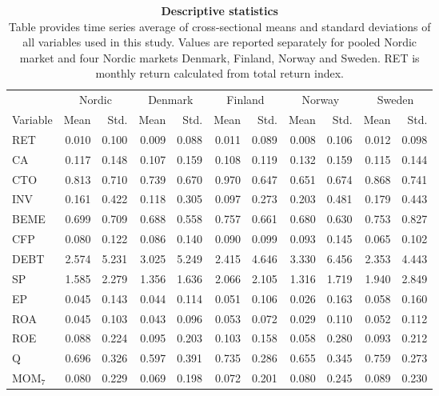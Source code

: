 \documentclass{article}
\begin{document}
\begin{table}[ht] 
\small
\caption[Descriptive statistics]{\textbf{Descriptive statistics}\\ Table provides time series average of cross-sectional means and standard deviations of all variables used in this study. Values are reported separately for pooled Nordic market and four Nordic markets Denmark, Finland, Norway and Sweden. RET is monthly return calculated from total return index.}
 \label{table:descriptive}
\centering
\begin{tabularx}{\textwidth}{@{\extracolsep{1pt}} X r r r r r r r r r r} 
\toprule
 & \multicolumn{2}{c}{Nordic} & \multicolumn{2}{c}{Denmark} & \multicolumn{2}{c}{Finland} & \multicolumn{2}{c}{Norway}&\multicolumn{2}{c}{Sweden} \\
\cline{2-3}\cline{4-5}\cline{6-7}\cline{8-9}\cline{10-11}
Variable 		& Mean 	& Std. 	& Mean 	& Std. 	& Mean 	& Std. 	& Mean 	& Std. 	& Mean 	& Std. \\
\midrule
RET			& 0.010 	& 0.100	& 0.009 	& 0.088	& 0.011	& 0.089	& 0.008	& 0.106	& 0.012	& 0.098 \\
CA		 	& 0.117 	& 0.148	& 0.107 	& 0.159	& 0.108	& 0.119	& 0.132	& 0.159	& 0.115	& 0.144 \\
CTO		 	& 0.813  	& 0.710 	& 0.739 	& 0.670	& 0.970	& 0.647	& 0.651	& 0.674	& 0.868	& 0.741 \\
INV 			& 0.161 	& 0.422	& 0.118 	& 0.305	& 0.097	& 0.273	& 0.203	& 0.481	& 0.179	& 0.443 \\
BEME	 	& 0.699 	& 0.709	& 0.688 	& 0.558	& 0.757	& 0.661	& 0.680	& 0.630	& 0.753	& 0.827 \\
CFP	 		& 0.080 	& 0.122	& 0.086 	& 0.140	& 0.090	& 0.099	& 0.093	& 0.145	& 0.065	& 0.102 \\
DEBT	 	& 2.574 	& 5.231	& 3.025 	& 5.249	& 2.415	& 4.646	& 3.330	& 6.456	& 2.353	& 4.443 \\
SP 			& 1.585	& 2.279	& 1.356 	& 1.636	& 2.066	& 2.105	& 1.316	& 1.719	& 1.940	& 2.849 \\
EP 			& 0.045	& 0.143	& 0.044 	& 0.114	& 0.051	& 0.106	& 0.026	& 0.163	& 0.058	& 0.160 \\
ROA 		& 0.045	& 0.103	& 0.043 	& 0.096	& 0.053	& 0.072	& 0.029	& 0.110	& 0.052	& 0.112 \\
ROE 		& 0.088 	& 0.224	& 0.095 	& 0.203	& 0.103	& 0.158	& 0.058	& 0.280	& 0.093	& 0.212 \\
Q			& 0.696 	& 0.326	& 0.597 	& 0.391	& 0.735	& 0.286	& 0.655	& 0.345	& 0.759 	& 0.273 \\
MOM$_{7}$ 	& 0.080 	& 0.229	& 0.069 	& 0.198	& 0.072	& 0.201	& 0.080	& 0.245	& 0.089	& 0.230 \\

\end{tabularx}
\end{table}
\end{document}
